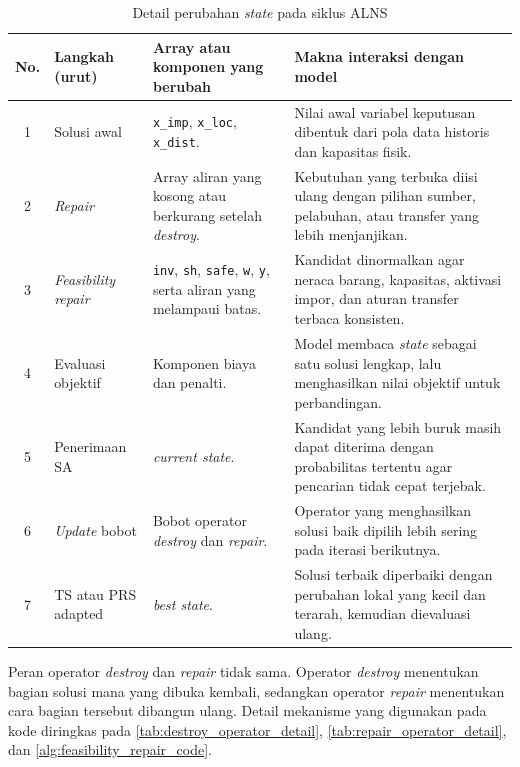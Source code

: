 \documentclass{file/TA-ITS}
\theoremstyle{definition}
\theoremstyle{definition}
\theoremstyle{plain}
\begin{document}
\begin{table}[H]
\centering
\caption{Detail perubahan \textit{state} pada siklus ALNS}
\label{tab:alns_cycle_detail}
\small
\renewcommand{\arraystretch}{1.38}
\begin{tabularx}{\textwidth}{@{}c p{}p{}X@{}}
\toprule
\textbf{No.} & \textbf{Langkah (urut)} & \textbf{Array atau komponen yang berubah} & \textbf{Makna interaksi dengan model} \\
\midrule
1 & Solusi awal & \texttt{x\_imp}, \texttt{x\_loc}, \texttt{x\_dist}. & Nilai awal variabel keputusan dibentuk dari pola data historis dan kapasitas fisik. \\
2 & \textit{Repair} & Array aliran yang kosong atau berkurang setelah \textit{destroy}. & Kebutuhan yang terbuka diisi ulang dengan pilihan sumber, pelabuhan, atau transfer yang lebih menjanjikan. \\
3 & \textit{Feasibility repair} & \texttt{inv}, \texttt{sh}, \texttt{safe}, \texttt{w}, \texttt{y}, serta aliran yang melampaui batas. & Kandidat dinormalkan agar neraca barang, kapasitas, aktivasi impor, dan aturan transfer terbaca konsisten. \\
4 & Evaluasi objektif & Komponen biaya dan penalti. & Model membaca \textit{state} sebagai satu solusi lengkap, lalu menghasilkan nilai objektif untuk perbandingan. \\
5 & Penerimaan SA & \textit{current state}. & Kandidat yang lebih buruk masih dapat diterima dengan probabilitas tertentu agar pencarian tidak cepat terjebak. \\
6 & \textit{Update} bobot & Bobot operator \textit{destroy} dan \textit{repair}. & Operator yang menghasilkan solusi baik dipilih lebih sering pada iterasi berikutnya. \\
7 & TS atau PRS adapted & \textit{best state}. & Solusi terbaik diperbaiki dengan perubahan lokal yang kecil dan terarah, kemudian dievaluasi ulang. \\
\bottomrule
\end{tabularx}
\end{table}
Peran operator \textit{destroy} dan \textit{repair} tidak sama. Operator \textit{destroy} menentukan bagian solusi mana yang dibuka kembali, sedangkan operator \textit{repair} menentukan cara bagian tersebut dibangun ulang. Detail mekanisme yang digunakan pada kode diringkas pada \ref{tab:destroy_operator_detail}, \ref{tab:repair_operator_detail}, dan \ref{alg:feasibility_repair_code}.
\end{document}
